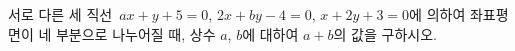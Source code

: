 서로 다른 세 직선~$ax+y+5=0$, $2x+by-4=0$, $x+2y+3=0$에 의하여 좌표평면이 네 부분으로 나누어질 때, 상수 $a$, $b$에 대하여 $a+b$의 값을 구하시오.

